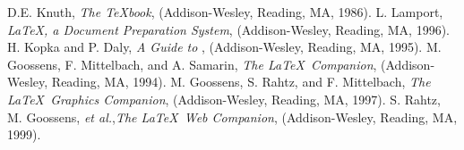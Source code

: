 \documentclass[%
,aps%
 ,twocolumn%
 ,secnumarabic%
,amssymb, amsmath,nobibnotes, aps, prl, floatfix]{revtex4-2}
\begin{document}
\begin{thebibliography}{}\label{sec:TeXbooks}
 D.E. Knuth, \emph{The \TeX book},
(Addison-Wesley, Reading, MA, 1986).
 L. Lamport, \emph{\LaTeX, a Document
Preparation System}, (Addison-Wesley, Reading, MA, 1996).
 H. Kopka and P. Daly, \emph{A Guide to
\LaTeXe}, (Addison-Wesley, Reading, MA, 1995).
 M. Goossens, F. Mittelbach, and
A. Samarin, \emph{The \LaTeX\
Companion}, (Addison-Wesley, Reading, MA, 1994).
 M. Goossens, S. Rahtz, and
F. Mittelbach, \emph{The
\LaTeX\ Graphics Companion}, (Addison-Wesley, Reading, MA, 1997).
\bibitem[Rahtz(1999)]{CompanW} S. Rahtz, M. Goossens, \emph{et
al.},\emph{The \LaTeX\ Web Companion}, (Addison-Wesley, Reading, MA, 1999).
\end{thebibliography}
\end{document}
